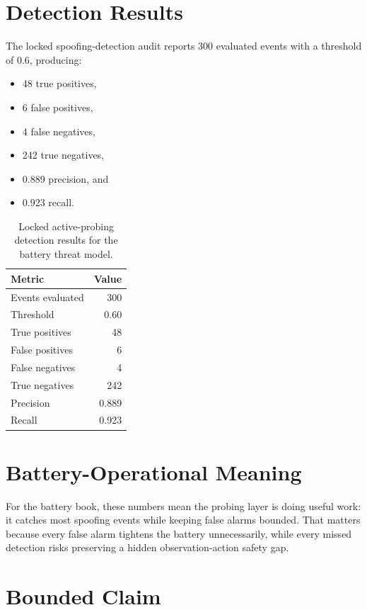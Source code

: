 \section{Detection Results}

The locked spoofing-detection audit reports 300 evaluated events with a
threshold of 0.6, producing:

\begin{itemize}
  \item 48 true positives,
  \item 6 false positives,
  \item 4 false negatives,
  \item 242 true negatives,
  \item 0.889 precision, and
  \item 0.923 recall.
\end{itemize}

\begin{table}[ht]
\centering
\caption{Locked active-probing detection results for the battery threat model.}
\label{tab:spoof-results}
\begin{tabular}{lr}
\toprule
\textbf{Metric} & \textbf{Value} \\
\midrule
Events evaluated & 300 \\
Threshold & 0.60 \\
True positives & 48 \\
False positives & 6 \\
False negatives & 4 \\
True negatives & 242 \\
Precision & 0.889 \\
Recall & 0.923 \\
\bottomrule
\end{tabular}
\end{table}

\section{Battery-Operational Meaning}

For the battery book, these numbers mean the probing layer is doing useful
work: it catches most spoofing events while keeping false alarms bounded.
That matters because every false alarm tightens the battery unnecessarily,
while every missed detection risks preserving a hidden observation-action
safety gap.

\section{Bounded Claim}

